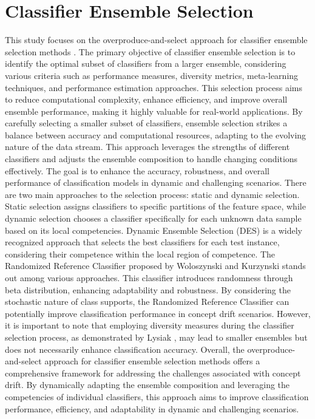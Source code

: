 %
%
\section{Classifier Ensemble Selection}

\label{sec:3_2_ensemble}
This study focuses on the overproduce-and-select approach for classifier ensemble selection methods \cite{cruz2017meta, kuncheva2000clustering, jackowski2014improved}. The primary objective of classifier ensemble selection is to identify the optimal subset of classifiers from a larger ensemble, considering various criteria such as performance measures, diversity metrics, meta-learning techniques, and performance estimation approaches. This selection process aims to reduce computational complexity, enhance efficiency, and improve overall ensemble performance, making it highly valuable for real-world applications. By carefully selecting a smaller subset of classifiers, ensemble selection strikes a balance between accuracy and computational resources, adapting to the evolving nature of the data stream. This approach leverages the strengths of different classifiers and adjusts the ensemble composition to handle changing conditions effectively. The goal is to enhance the accuracy, robustness, and overall performance of classification models in dynamic and challenging scenarios. There are two main approaches to the selection process: static and dynamic selection. Static selection assigns classifiers to specific partitions of the feature space, while dynamic selection chooses a classifier specifically for each unknown data sample based on its local competencies. Dynamic Ensemble Selection (DES) is a widely recognized approach that selects the best classifiers for each test instance, considering their competence within the local region of competence. The Randomized Reference Classifier proposed by Woloszynski and Kurzynski \cite{woloszynski2011probabilistic} stands out among various approaches. This classifier introduces randomness through beta distribution, enhancing adaptability and robustness. By considering the stochastic nature of class supports, the Randomized Reference Classifier can potentially improve classification performance in concept drift scenarios. However, it is important to note that employing diversity measures during the classifier selection process, as demonstrated by Lysiak \cite{lysiak2014optimal}, may lead to smaller ensembles but does not necessarily enhance classification accuracy. Overall, the overproduce-and-select approach for classifier ensemble selection methods offers a comprehensive framework for addressing the challenges associated with concept drift. By dynamically adapting the ensemble composition and leveraging the competencies of individual classifiers, this approach aims to improve classification performance, efficiency, and adaptability in dynamic and challenging scenarios.